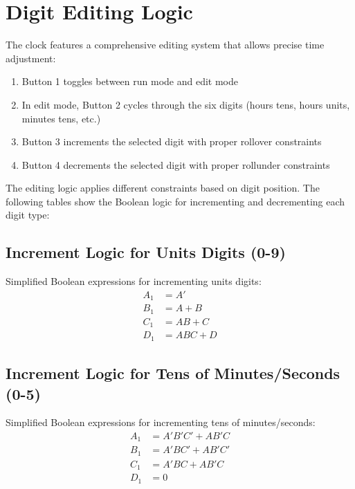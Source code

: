 \section{Digit Editing Logic}
The clock features a comprehensive editing system that allows precise time adjustment:

\begin{enumerate}
    \item Button 1 toggles between run mode and edit mode
    \item In edit mode, Button 2 cycles through the six digits (hours tens, hours units, minutes tens, etc.)
    \item Button 3 increments the selected digit with proper rollover constraints
    \item Button 4 decrements the selected digit with proper rollunder constraints
\end{enumerate}

The editing logic applies different constraints based on digit position. The following tables show the Boolean logic for incrementing and decrementing each digit type:

\subsection{Increment Logic for Units Digits (0-9)}


Simplified Boolean expressions for incrementing units digits:
\begin{align}
    A_1 &= A' \\
    B_1 &= A + B \\
    C_1 &= AB + C \\
    D_1 &= ABC + D
\end{align}

\subsection{Increment Logic for Tens of Minutes/Seconds (0-5)}


Simplified Boolean expressions for incrementing tens of minutes/seconds:
\begin{align}
    A_1 &= A'B'C' + AB'C \\
    B_1 &= A'BC' + AB'C' \\
    C_1 &= A'BC + AB'C \\
    D_1 &= 0
\end{align}

